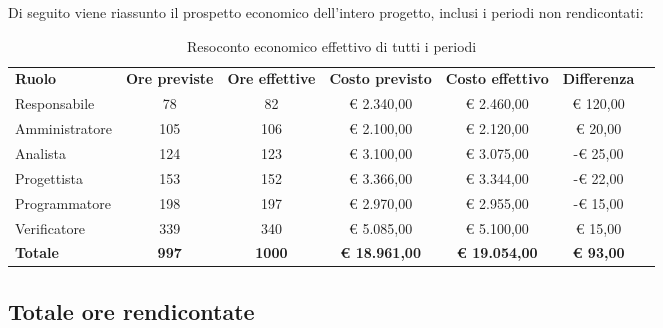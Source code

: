 \documentclass[../piano-di-progetto.tex]{subfiles}
\begin{document}
  Di seguito viene riassunto il prospetto economico dell'intero progetto, inclusi i periodi non rendicontati:
    \begin{table}[H]
    \centering
    \begin{tabular}{lcccccc}
      \rowcolor{lightgray}
      \textbf{Ruolo}  & \textbf{Ore previste} & \textbf{Ore effettive} & \textbf{Costo previsto} & \textbf{Costo effettivo} & \textbf{Differenza} \\
Responsabile    & 78           & 82            & € 2.340,00           & € 2.460,00           & € 120,00         \\
Amministratore  & 105          & 106           & € 2.100,00           & € 2.120,00           & € 20,00          \\
Analista        & 124          & 123           & € 3.100,00           & € 3.075,00           & -€ 25,00         \\
Progettista     & 153          & 152           & € 3.366,00           & € 3.344,00           & -€ 22,00         \\
Programmatore   & 198          & 197           & € 2.970,00           & € 2.955,00           & -€ 15,00         \\
Verificatore    & 339          & 340           & € 5.085,00           & € 5.100,00           & € 15,00          \\
\textbf{Totale} & \textbf{997} & \textbf{1000} & \textbf{€ 18.961,00} & \textbf{€ 19.054,00} & \textbf{€ 93,00}
      
    \end{tabular}
    \caption{Resoconto economico effettivo di tutti i periodi}
  \end{table}
  
  \subsection{Totale ore rendicontate}
  
\end{document}
